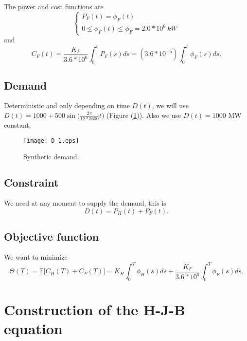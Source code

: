\documentclass[12pt]{article}
\theoremstyle{definition}
\theoremstyle{remark}
\newcommand{\E}{\mathbb{E}}
\begin{document}
The power and cost functions are
\begin{equation*}
\begin{cases}
P_F(t)=\phi_F(t)\\
0\leq\phi_F(t)\leq\overline{\phi_F}=2.0*10^6\ kW
\end{cases}
\end{equation*}
and
\begin{equation*}
C_F(t)=\frac{K_F}{3.6*10^6}\int_0^tP_F(s)ds=(3.6*10^{-5})\int_0^t\phi_F(s)ds.
\end{equation*}

\subsection{Demand}

Deterministic and only depending on time $D(t)$, we will use $D(t)=1000+500\sin\big(\frac{2\pi}{12*3600}t\big)$ (Figure (\ref{D_1})). Also we use $D(t)=1000$ MW constant.
\begin{figure}[ht!]
\centering
\texttt{[image: D\_1.eps]}
\caption{Synthetic demand.}
\label{D_1}
\end{figure}

\subsection{Constraint}

We need at any moment to supply the demand, this is
\begin{equation*}
D(t)=P_H(t)+P_F(t).
\end{equation*}

\subsection{Objective function}

We want to minimize
\begin{equation*}
\Theta(T)=\E\Big[C_H(T)+C_F(T)\Big]=K_H\int_0^T\phi_H(s)ds+\frac{K_F}{3.6*10^6}\int_0^T\phi_F(s)ds.
\end{equation*}

\section{Construction of the H-J-B equation}
\end{document}
